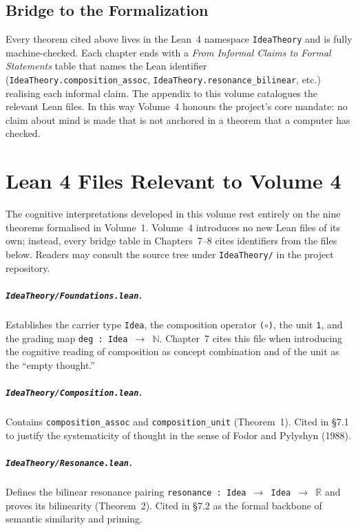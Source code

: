 \documentclass[11pt,oneside]{book}
\begin{document}
\section*{Bridge to the Formalization}
Every theorem cited above lives in the Lean~4 namespace
\texttt{IdeaTheory} and is fully machine-checked.  Each chapter
ends with a \emph{From Informal Claims to Formal Statements} table
that names the Lean identifier (\texttt{IdeaTheory.composition\_assoc},
\texttt{IdeaTheory.resonance\_bilinear}, etc.) realising each
informal claim.  The appendix to this volume catalogues the
relevant Lean files.  In this way Volume~4 honours the project's
core mandate: no claim about mind is made that is not anchored in a
theorem that a computer has checked.




\appendix
\chapter{Lean 4 Files Relevant to Volume 4}
\label{app:vol4-lean}

The cognitive interpretations developed in this volume rest entirely
on the nine theorems formalised in Volume~1.  Volume~4 introduces no
new Lean files of its own; instead, every bridge table in
Chapters~7--8 cites identifiers from the files below.  Readers may
consult the source tree under \texttt{IdeaTheory/} in the project
repository.

\paragraph{\texttt{IdeaTheory/Foundations.lean}.}
Establishes the carrier type \texttt{Idea}, the composition operator
\texttt{(\(\circ\))}, the unit \texttt{1}, and the grading map
\texttt{deg : Idea \(\to\) \(\mathbb{N}\)}.  Chapter~7 cites this
file when introducing the cognitive reading of composition as
concept combination and of the unit as the ``empty thought.''

\paragraph{\texttt{IdeaTheory/Composition.lean}.}
Contains \texttt{composition\_assoc} and \texttt{composition\_unit}
(Theorem~1).  Cited in \S 7.1 to justify the systematicity of
thought in the sense of Fodor and Pylyshyn (1988).

\paragraph{\texttt{IdeaTheory/Resonance.lean}.}
Defines the bilinear resonance pairing
\texttt{resonance : Idea \(\to\) Idea \(\to\) \(\mathbb{R}\)} and
proves its bilinearity (Theorem~2).  Cited in \S 7.2 as the formal
backbone of semantic similarity and priming.
\end{document}
